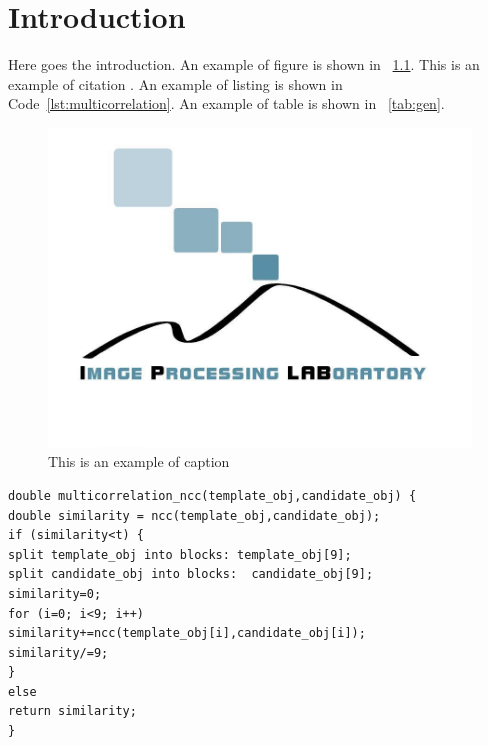 \chapter{Introduction}
Here goes the introduction. An example of figure is shown in \figurename{~\ref{fig:immagine}}. This is an example of citation \cite{iplab}. An example of listing is shown in Code~\ref{lst:multicorrelation}. An example of table is shown in \tablename~\ref{tab:gen}.

\begin{figure}[t]
	\includegraphics[width=1\linewidth]{Images/iplab}
	\caption{This is an example of caption}
	\label{fig:immagine} 
\end{figure}


\begin{lstlisting}[caption={Caption},label=lst:multicorrelation]
double multicorrelation_ncc(template_obj,candidate_obj) {
double similarity = ncc(template_obj,candidate_obj);
if (similarity<t) {
split template_obj into blocks: template_obj[9];
split candidate_obj into blocks:  candidate_obj[9];
similarity=0;
for (i=0; i<9; i++)
similarity+=ncc(template_obj[i],candidate_obj[i]);
similarity/=9;
}
else
return similarity;
}
\end{lstlisting}

